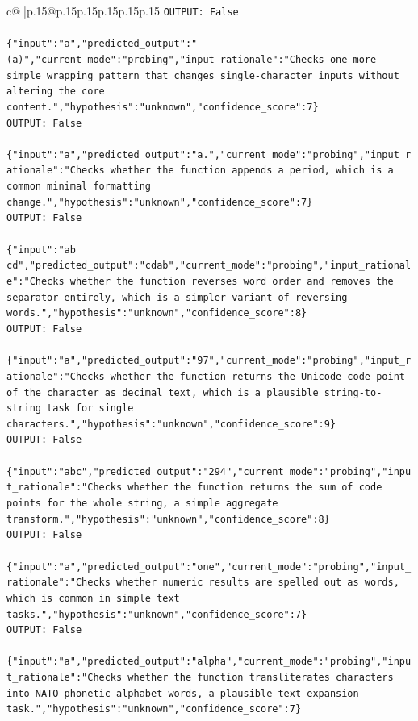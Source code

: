 \documentclass{article}
\begin{document}
{\begin{supertabular}{c@{$\;$}|p{.15\linewidth}@{}p{.15\linewidth}p{.15\linewidth}p{.15\linewidth}p{.15\linewidth}p{.15\linewidth}}
{{{\texttt{OUTPUT: False} \\
\\ 
\texttt{\{"input":"a","predicted\_output":"(a)","current\_mode":"probing","input\_rationale":"Checks one more simple wrapping pattern that changes single{-}character inputs without altering the core content.","hypothesis":"unknown","confidence\_score":7\}} \\
\texttt{OUTPUT: False} \\
\\ 
\texttt{\{"input":"a","predicted\_output":"a.","current\_mode":"probing","input\_rationale":"Checks whether the function appends a period, which is a common minimal formatting change.","hypothesis":"unknown","confidence\_score":7\}} \\
\texttt{OUTPUT: False} \\
\\ 
\texttt{\{"input":"ab cd","predicted\_output":"cdab","current\_mode":"probing","input\_rationale":"Checks whether the function reverses word order and removes the separator entirely, which is a simpler variant of reversing words.","hypothesis":"unknown","confidence\_score":8\}} \\
\texttt{OUTPUT: False} \\
\\ 
\texttt{\{"input":"a","predicted\_output":"97","current\_mode":"probing","input\_rationale":"Checks whether the function returns the Unicode code point of the character as decimal text, which is a plausible string{-}to{-}string task for single characters.","hypothesis":"unknown","confidence\_score":9\}} \\
\texttt{OUTPUT: False} \\
\\ 
\texttt{\{"input":"abc","predicted\_output":"294","current\_mode":"probing","input\_rationale":"Checks whether the function returns the sum of code points for the whole string, a simple aggregate transform.","hypothesis":"unknown","confidence\_score":8\}} \\
\texttt{OUTPUT: False} \\
\\ 
\texttt{\{"input":"a","predicted\_output":"one","current\_mode":"probing","input\_rationale":"Checks whether numeric results are spelled out as words, which is common in simple text tasks.","hypothesis":"unknown","confidence\_score":7\}} \\
\texttt{OUTPUT: False} \\
\\ 
\texttt{\{"input":"a","predicted\_output":"alpha","current\_mode":"probing","input\_rationale":"Checks whether the function transliterates characters into NATO phonetic alphabet words, a plausible text expansion task.","hypothesis":"unknown","confidence\_score":7\}} \\
}}}
\end{supertabular}}
\end{document}
